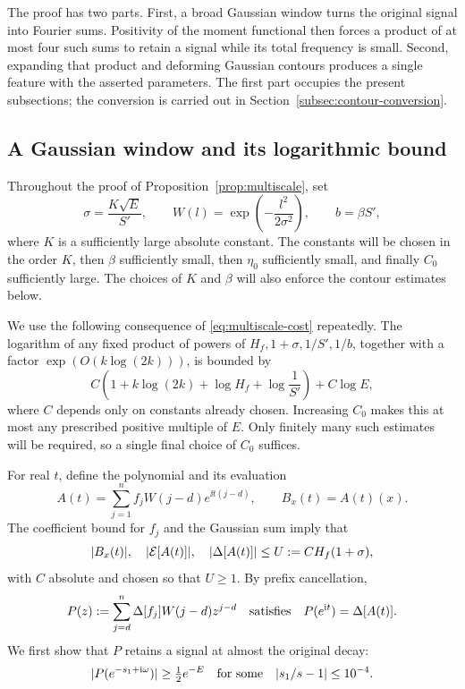 The proof has two parts.  First, a broad Gaussian window turns the original
signal into Fourier sums.  Positivity of the moment functional then forces a
product of at most four such sums to retain a signal while its total frequency
is small.  Second, expanding that product and deforming Gaussian contours
produces a single feature with the asserted parameters.  The first part
occupies the present subsections; the conversion is carried out in
Section~\ref{subsec:contour-conversion}.

\subsection{A Gaussian window and its logarithmic bound}

Throughout the proof of Proposition~\ref{prop:multiscale}, set
\begin{equation}\label{eq:window-parameters}
 \sigma=\frac{K\sqrt E}{S'},\qquad
 W(l)=\exp\left(-\frac{l^2}{2\sigma^2}\right),\qquad b=\beta S',
\end{equation}
where $K$ is a sufficiently large absolute constant.  The constants will be
chosen in the order $K$, then $\beta$ sufficiently small, then $\eta_0$
sufficiently small, and finally $C_0$ sufficiently large.  The choices of $K$
and $\beta$ will also enforce the contour estimates below.

We use the following consequence of \eqref{eq:multiscale-cost} repeatedly.
The logarithm of any fixed product of powers of
$H_f,1+\sigma,1/S',1/b$, together with a factor
$\exp(O(k\log(2k)))$, is bounded by
\[
 C\left(1+k\log(2k)+\log H_f+\log\frac1{S'}\right)+C\log E,
\]
where $C$ depends only on constants already chosen.  Increasing $C_0$ makes
this at most any prescribed positive multiple of $E$.  Only finitely many
such estimates will be required, so a single final choice of $C_0$ suffices.

For real $t$, define the polynomial and its evaluation
\begin{equation}\label{eq:window-sums}
 A(t)=\sum_{j=1}^n f_jW(j-d)e^{\ii t(j-d)},\qquad B_x(t)=A(t)(x).
\end{equation}
The coefficient bound for $f_j$ and the Gaussian sum imply that
\begin{equation}\label{eq:window-uniform-bound}
 \lvert B_x(t)\rvert,\quad \lvert \mathcal E[A(t)]\rvert,\quad \lvert \Delta[A(t)]\rvert
 \le U:=C H_f(1+\sigma),
\end{equation}
with $C$ absolute and chosen so that $U\ge1$.
By prefix cancellation,
\[
 P(z):=\sum_{j=d}^n\Delta[f_j]W(j-d)z^{j-d}
 \quad\hbox{satisfies}\quad P(e^{\mathrm i t})=\Delta[A(t)].
\]
We first show that $P$ retains a signal at almost the original decay:
\begin{equation}\label{eq:window-interior-signal}
 \lvert P(e^{-s_1+\mathrm i\omega})\rvert\ge\tfrac12e^{-E}
 \quad\hbox{for some}\quad \lvert s_1/s-1\rvert\le10^{-4}.
\end{equation}

